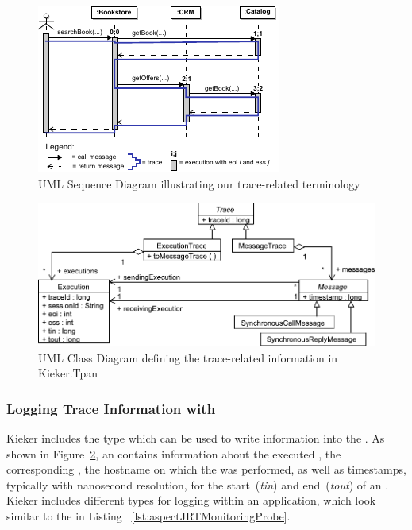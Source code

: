 \begin{figure}\centering
\includegraphics[width=0.96\columnwidth]{figures/eoiessBookstoreDemo-extended-2-combined}
\caption{UML Sequence Diagram illustrating our trace-related terminology}
\label{fig:exampleTraceTerminology}
\end{figure}

\begin{figure}\centering
\includegraphics[scale=0.65]{figures/model/kieker_tracemodel-crop}
\caption{UML Class Diagram defining the trace-related information in Kieker.Tpan}
\label{fig:kiekerTraceRepresentations}
\end{figure}

\subsubsection{Logging Trace Information with \KiekerTpmon{}}

Kieker includes the \MonitoringRecord{} type \KiekerExecutionRecord{} which can %
be used to write \execution{} information into the \MonitoringLog{}. %
As shown in Figure~\ref{fig:kiekerTraceRepresentations}, an \KiekerExecutionRecord{} %
contains information about the executed \operation{}, the corresponding \component{}, 
the hostname on which the \execution{} was performed, as well as timestamps, %
typically with nanosecond resolution, for the start~(\textit{tin}) and end~(\textit{tout}) %
of an \execution{}. %
Kieker includes different \MonitoringProbe{} types for logging \KiekerExecutionRecords{} %
within an application, which look similar to the \MonitoringProbe{} in Listing~%
\ref{lst:aspectJRTMonitoringProbe}. %

